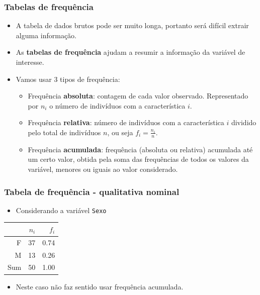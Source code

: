 \documentclass[11pt]{beamer}
\begin{document}
\begin{frame}
\frametitle{Tabelas de frequência}

\begin{itemize}
\item
  A tabela de dados brutos pode ser muito longa, portanto será difícil
  extrair alguma informação.
\item
  As \textbf{tabelas de frequência} ajudam a resumir a informação da
  variável de interesse.
\item
  Vamos usar 3 tipos de frequência:

  \begin{itemize}
  \item
    Frequência \textbf{absoluta}: contagem de cada valor observado.
    Representado por \(n_i\) o número de indivíduos com a característica
    \(i\).
  \item
    Frequência \textbf{relativa}: número de indivíduos com a
    característica \(i\) dividido pelo total de indivíduos \(n\), ou
    seja \(f_i = \frac{n_i}{n}\).
  \item
    Frequência \textbf{acumulada}: frequência (absoluta ou relativa)
    acumulada até um certo valor, obtida pela soma das frequências de
    todos os valores da variável, menores ou iguais ao valor
    considerado.
  \end{itemize}
\end{itemize}
\end{frame}

\begin{frame}
\frametitle{Tabela de frequência - qualitativa nominal}

\begin{itemize}
\item
  Considerando a variável \texttt{Sexo}
\end{itemize}

\begin{table}[ht]
\centering
\begin{tabular}{rrr}
  \hline
 & $n_i$ & $f_i$ \\ 
  \hline
F & 37 & 0.74 \\ 
  M & 13 & 0.26 \\ 
   \hline
Sum & 50 & 1.00 \\ 
   \hline
\end{tabular}
\end{table}

\begin{itemize}
\item
  Neste caso não faz sentido usar frequência acumulada.
\end{itemize}
\end{frame}
\end{document}
